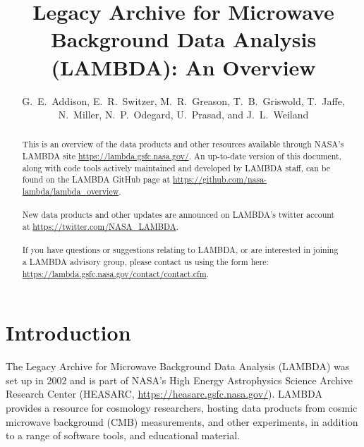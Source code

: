 \documentclass[letter]{emulateapj}
\begin{document}
\title{Legacy Archive for Microwave Background Data Analysis (LAMBDA): An Overview}

\author{G.~E.~Addison, E.~R.~Switzer, M.~R.~Greason, T.~B.~Griswold, T.~Jaffe, N.~Miller, N.~P.~Odegard, U.~Prasad, and J.~L.~Weiland}


\begin{abstract}

\noindent
This is an overview of the data products and other resources available through NASA's LAMBDA site \href{https://lambda.gsfc.nasa.gov/}{https://lambda.gsfc.nasa.gov/}. An up-to-date version of this document, along with code tools actively maintained and developed by LAMBDA staff, can be found on the LAMBDA GitHub page at \href{https://github.com/nasa-lambda/lambda_overview}{https://github.com/nasa-lambda/lambda\_overview}.\\\\New data products and other updates are announced on LAMBDA's twitter account at \href{https://twitter.com/NASA_LAMBDA}{https://twitter.com/NASA\_LAMBDA}.\\\\If you have questions or suggestions relating to LAMBDA, or are interested in joining a LAMBDA advisory group, please contact us using the form here: \href{https://lambda.gsfc.nasa.gov/contact/contact.cfm}{https://lambda.gsfc.nasa.gov/contact/contact.cfm}.

\end{abstract}

\section{Introduction}

The Legacy Archive for Microwave Background Data Analysis (LAMBDA) was set up in 2002 and is part of NASA's High Energy Astrophysics Science Archive Research Center (HEASARC, \href{https://heasarc.gsfc.nasa.gov/}{https://heasarc.gsfc.nasa.gov/}). LAMBDA provides a resource for cosmology researchers, hosting data products from cosmic microwave background (CMB) measurements, and other experiments, in addition to a range of software tools, and educational material.
\end{document}
